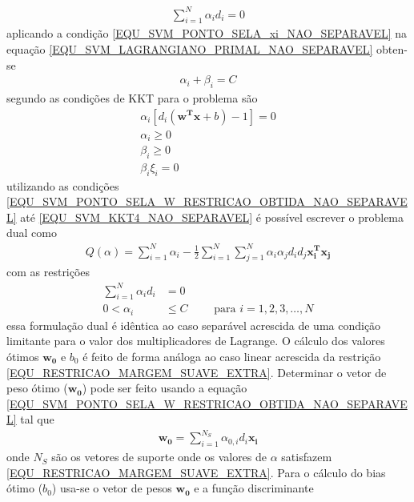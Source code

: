 \begin{align}
\sum\limits_{i=1}^{N} \alpha_{i}d_{i} = 0 \label{EQU_SVM_PONTO_SELA_B_RESTRICAO_OBTIDA_NAO_SEPARAVEL}
\end{align}
aplicando a condição \eqref{EQU_SVM_PONTO_SELA_xi_NAO_SEPARAVEL} na equação \eqref{EQU_SVM_LAGRANGIANO_PRIMAL_NAO_SEPARAVEL} obten-se
\begin{align}
\alpha_{i}+\beta_{i} = C \label{EQU_SVM_PONTO_SELA_xi_RESTRICAO_OBTIDA_NAO_SEPARAVEL}
\end{align}
segundo  as condições de KKT para o problema são
\begin{align}
\alpha_{i}[d_{i}(\mathbf{w^{T}}\mathbf{x} + b) - 1] = 0 \label{EQU_SVM_KKT1_NAO_SEPARAVEL}\\
\alpha_{i} \geq 0 \label{EQU_SVM_KKT2_NAO_SEPARAVEL}\\
\beta_{i} \geq 0 \label{EQU_SVM_KKT3_NAO_SEPARAVEL}\\
\beta_{i}\xi_{i} = 0 \label{EQU_SVM_KKT4_NAO_SEPARAVEL}
\end{align}
utilizando as condições \eqref{EQU_SVM_PONTO_SELA_W_RESTRICAO_OBTIDA_NAO_SEPARAVEL} até \eqref{EQU_SVM_KKT4_NAO_SEPARAVEL} é possível escrever o problema dual como
\begin{align}
Q(\alpha) = \sum\limits_{i=1}^{N} \alpha_{i} - \frac{1}{2} \sum\limits_{i=1}^{N} \sum\limits_{j=1}^{N} \alpha_{i}\alpha_{j}d_{i}d_{j}\mathbf{x_{i}^{T}}\mathbf{x_{j}} \label{EQU_SVM_OBJETIVO_NAO_SEPARAVEL_DUAL}
\end{align}
com as restrições
\begin{align}
\sum\limits_{i=1}^{N} \alpha_{i}d_{i} &= 0 \\
0 < \alpha_{i} &\leq C	\qquad \textrm{ para } i = 1, 2, 3, \ldots, N \label{EQU_RESTRICAO_MARGEM_SUAVE_EXTRA}
\end{align}
essa formulação dual é idêntica ao caso separável acrescida de uma condição limitante para o valor dos multiplicadores de Lagrange. O cálculo dos valores ótimos \(\mathbf{w_{0}}\) e \(b_{0}\) é feito de forma análoga ao caso linear acrescida da restrição \eqref{EQU_RESTRICAO_MARGEM_SUAVE_EXTRA}. Determinar o vetor de peso ótimo (\(\mathbf{w_{0}}\)) pode ser feito usando a equação \eqref{EQU_SVM_PONTO_SELA_W_RESTRICAO_OBTIDA_NAO_SEPARAVEL} tal que
\begin{align}
\mathbf{w_{0}} = \sum\limits_{i=1}^{N_{S}} \alpha_{0,i}d_{i}\mathbf{x_{i}} \label{EQU_SVM_W_OTIMO_MARGEM_SUAVE}
\end{align}
onde \(N_{S}\) são os vetores de suporte onde os valores de \(\alpha\) satisfazem \eqref{EQU_RESTRICAO_MARGEM_SUAVE_EXTRA}. Para o cálculo do bias ótimo (\(b_{0}\)) usa-se o vetor de pesos \(\mathbf{w_{0}}\) e a função discriminante
